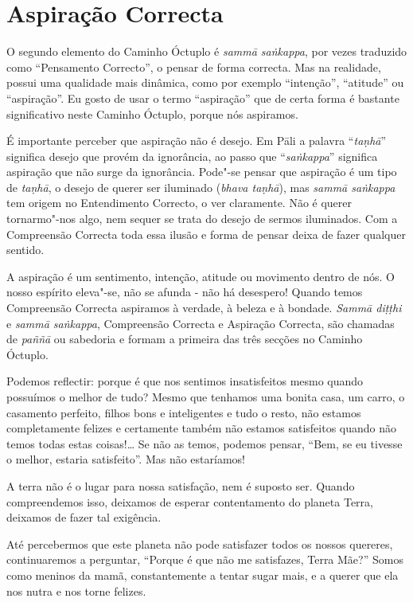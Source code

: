 \section{Aspiração Correcta}

O segundo elemento do Caminho Óctuplo é \emph{sammā saṅkappa}, por vezes traduzido como
“Pensamento Correcto”, o pensar de forma correcta. Mas na realidade, possui uma
qualidade mais dinâmica, como por exemplo “intenção”, “atitude” ou “aspiração”.
Eu gosto de usar o termo “aspiração” que de certa forma é bastante significativo
neste Caminho Óctuplo, porque nós aspiramos.

É importante perceber que aspiração não é desejo. Em Pāli a palavra
“\emph{taṇhā}” significa desejo que provém da ignorância, ao passo que
“\emph{saṅkappa}” significa aspiração que não surge da ignorância. Pode"-se
pensar que aspiração é um tipo de \emph{taṇhā}, o desejo de querer ser iluminado
(\emph{bhava taṇhā}), mas \emph{sammā saṅkappa} tem origem no Entendimento
Correcto, o ver claramente. Não é querer tornarmo"-nos algo, nem sequer se
trata do desejo de sermos iluminados. Com a Compreensão Correcta toda essa ilusão
e forma de pensar deixa de fazer qualquer sentido.

A aspiração é um sentimento, intenção, atitude ou movimento dentro de nós. O
nosso espírito eleva"-se, não se afunda - não há desespero! Quando temos
Compreensão Correcta aspiramos à verdade, à beleza e à bondade. \emph{Sammā
  diṭṭhi} e \emph{sammā saṅkappa}, Compreensão Correcta e Aspiração Correcta,
são chamadas de \emph{paññā} ou sabedoria e formam a primeira das três secções
no Caminho Óctuplo.

\sectionBreak

Podemos reflectir: porque é que nos sentimos insatisfeitos mesmo quando
possuímos o melhor de tudo? Mesmo que tenhamos uma bonita casa, um carro, o
casamento perfeito, filhos bons e inteligentes e tudo o resto, não estamos
completamente felizes e certamente também não estamos satisfeitos quando não
temos todas estas coisas!\ldots{} Se não as temos, podemos pensar, “Bem, se eu
tivesse o melhor, estaria satisfeito”. Mas não estaríamos!

A terra não é o lugar
para nossa satisfação, nem é suposto ser. Quando compreendemos isso, deixamos de
esperar contentamento do planeta Terra, deixamos de fazer tal exigência.

Até percebermos que este planeta não pode satisfazer todos os nossos quereres,
continuaremos a perguntar, “Porque é que não me satisfazes, Terra Mãe?” Somos
como meninos da mamã, constantemente a tentar sugar mais, e a querer que ela nos
nutra e nos torne felizes.

